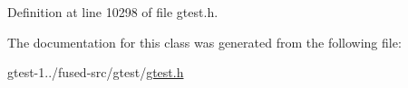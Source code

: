 \-Definition at line 10298 of file gtest.\-h.



\-The documentation for this class was generated from the following file\-:\begin{DoxyCompactItemize}
\item 
gtest-\/1../fused-\/src/gtest/\hyperlink{fused-src_2gtest_2gtest_8h}{gtest.\-h}\end{DoxyCompactItemize}
